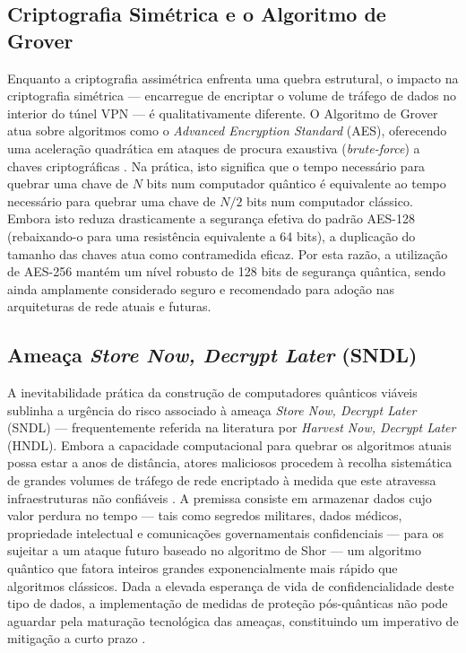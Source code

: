 \documentclass[runningheads]{llncs}
\begin{document}
\subsection{Criptografia Simétrica e o Algoritmo de Grover}
Enquanto a criptografia assimétrica enfrenta uma quebra estrutural, o impacto na criptografia simétrica — encarregue de encriptar o volume de tráfego de dados no interior do túnel VPN — é qualitativamente diferente. O Algoritmo de Grover atua sobre algoritmos como o \textit{Advanced Encryption Standard} (AES), oferecendo uma aceleração quadrática em ataques de procura exaustiva (\textit{brute-force}) a chaves criptográficas \cite{article}. Na prática, isto significa que o tempo necessário para quebrar uma chave de $N$ bits num computador quântico é equivalente ao tempo necessário para quebrar uma chave de $N/2$ bits num computador clássico. Embora isto reduza drasticamente a segurança efetiva do padrão AES-128 (rebaixando-o para uma resistência equivalente a 64 bits), a duplicação do tamanho das chaves atua como contramedida eficaz. Por esta razão, a utilização de AES-256 mantém um nível robusto de 128 bits de segurança quântica, sendo ainda amplamente considerado seguro e recomendado para adoção nas arquiteturas de rede atuais e futuras.

\subsection{Ameaça \textit{Store Now, Decrypt Later} (SNDL)}
A inevitabilidade prática da construção de computadores quânticos viáveis sublinha a urgência do risco associado à ameaça \textit{Store Now, Decrypt Later} (SNDL) — frequentemente referida na literatura por \textit{Harvest Now, Decrypt Later} (HNDL). Embora a capacidade computacional para quebrar os algoritmos atuais possa estar a anos de distância, atores maliciosos procedem à recolha sistemática de grandes volumes de tráfego de rede encriptado à medida que este atravessa infraestruturas não confiáveis \cite{kundu2026postquantumcryptographicanalysismessage}. A premissa consiste em armazenar dados cujo valor perdura no tempo — tais como segredos militares, dados médicos, propriedade intelectual e comunicações governamentais confidenciais — para os sujeitar a um ataque futuro baseado no algoritmo de Shor --- um algoritmo quântico que fatora inteiros grandes exponencialmente mais rápido que algoritmos clássicos. Dada a elevada esperança de vida de confidencialidade deste tipo de dados, a implementação de medidas de proteção pós-quânticas não pode aguardar pela maturação tecnológica das ameaças, constituindo um imperativo de mitigação a curto prazo \cite{article}.
\end{document}
